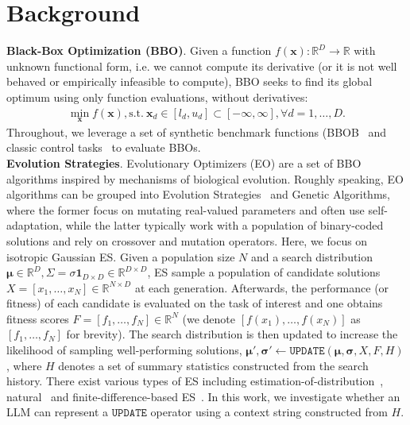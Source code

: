 \documentclass[sigconf]{acmart}
\begin{document}
\section{Background}
\textbf{Black-Box Optimization (BBO)}. Given a function $f(\mathbf{x}): \mathbb{R}^D \to \mathbb{R}$ with unknown functional form, i.e. we cannot compute its derivative (or it is not well behaved or empirically infeasible to compute), BBO seeks to find its global optimum using only function evaluations, without derivatives:
\begin{align*}
    \min_\mathbf{x} f(\mathbf{x}), \text{s.t.} \ \mathbf{x}_d \in [l_d, u_d] \subset [-\infty, \infty], \forall d=1,\dots,D.
\end{align*}
Throughout, we leverage a set of synthetic benchmark functions (BBOB~\cite{hansen2010real} and classic control tasks~\cite{brockman2016openai} to evaluate BBOs.\\
\textbf{Evolution Strategies}. Evolutionary Optimizers (EO) are a set of BBO algorithms inspired by mechanisms of biological evolution. Roughly speaking, EO algorithms can be grouped into Evolution Strategies~\cite{rechenberg1978evolutionsstrategien} and Genetic Algorithms, where the former focus on mutating real-valued parameters and often use self-adaptation, while the latter typically work with a population of binary-coded solutions and rely on crossover and mutation operators.
Here, we focus on isotropic Gaussian ES. Given a population size $N$ and a search distribution $\boldsymbol{\mu} \in \mathbb{R}^D, \Sigma = \sigma \mathbf{1}_{D \times D} \in \mathbb{R}^{D \times D}$, ES sample a population of candidate solutions $X = [x_1, \dots, x_N] \in \mathbb{R}^{N \times D}$ at each generation. Afterwards, the performance (or fitness) of each candidate is evaluated on the task of interest and one obtains fitness scores $F=[f_1, \dots, f_N] \in \mathbb{R}^N$ (we denote $[f(x_1), \dots, f(x_N)]$ as $[f_1, \dots, f_N]$ for brevity). The search distribution is then updated to increase the likelihood of sampling well-performing solutions, $\boldsymbol{\mu}', \boldsymbol{\sigma}' \leftarrow \texttt{UPDATE}(\boldsymbol{\mu}, \boldsymbol{\sigma}, X, F, H)$, where $H$ denotes a set of summary statistics constructed from the search history. There exist various types of ES including estimation-of-distribution~\cite{hansen2006cma}, natural~\cite{schaul2011high, wierstra2014natural} and finite-difference-based ES~\cite{salimans2017evolution}. In this work, we investigate whether an LLM can represent a $\texttt{UPDATE}$ operator using a context string constructed from $H$.\\
\end{document}
